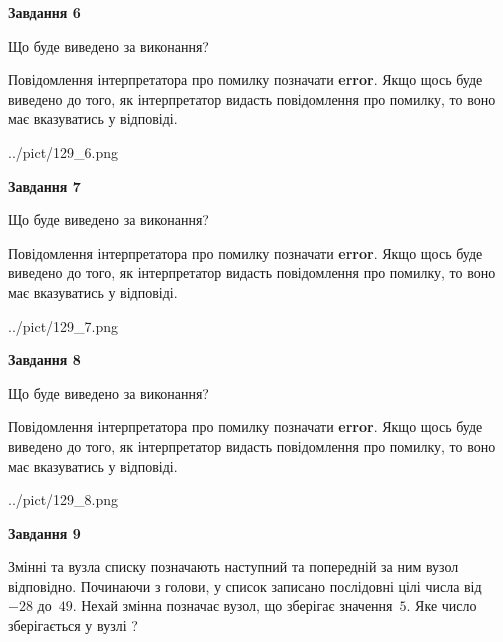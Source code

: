 \documentclass[12pt, ukrainian]{article}
\begin{document}
{\begin {large}
{\begin {center}\textbf{Завдання 6}\end {center}}\par
Що буде виведено за виконання?

Повідомлення інтерпретатора про помилку позначати \textbf{error}.
Якщо щось буде виведено до того, як інтерпретатор видасть повідомлення про помилку, 
то воно має вказуватись у відповіді. \par


\begin{center}
	{../pict/129_6.png}
\end{center}
\newpage

{\begin {center}\textbf{Завдання 7}\end {center}}\par
Що буде виведено за виконання?

Повідомлення інтерпретатора про помилку позначати \textbf{error}.
Якщо щось буде виведено до того, як інтерпретатор видасть повідомлення про помилку, 
то воно має вказуватись у відповіді. \par


\begin{center}
	{../pict/129_7.png}
\end{center}
\newpage

{\begin {center}\textbf{Завдання 8}\end {center}}\par
Що буде виведено за виконання?

Повідомлення інтерпретатора про помилку позначати \textbf{error}.
Якщо щось буде виведено до того, як інтерпретатор видасть повідомлення про помилку, 
то воно має вказуватись у відповіді. \par


\begin{center}
	{../pict/129_8.png}
\end{center}
\newpage

{\begin {center}\textbf{Завдання 9}\end {center}}\par
Змінні  та  вузла списку позначають наступний та попередній за ним вузол відповідно. Починаючи з голови, у список записано послідовні цілі числа від~$-28$ до~$49$. Нехай змінна  позначає вузол, що зберігає значення~$5$.
Яке число зберігається у вузлі  ?\par
\newpage


\end{large}}
\end{document}
